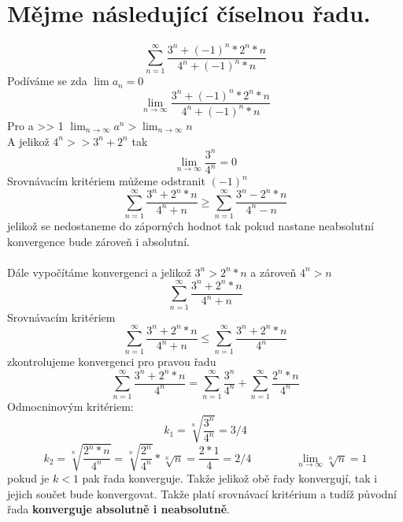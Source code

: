 \documentclass[a4paper,titlepage]{article}
\begin{document}
\section{Mějme následující číselnou řadu.}
$$
\sum^{\infty}_{n=1}\frac{3^n+(-1)^n*2^n*n}{4^n + (-1)^n*n}
$$
Podíváme se zda $\lim a_n = 0$
$$
\lim_{n\to \infty}\frac{3^n+(-1)^n*2^n*n}{4^n + (-1)^n*n}
$$
Pro a >> 1 $ \lim_{n\to \infty} a^n > \lim_{n\to \infty} n $\\
A jelikož $4^n >> 3^n + 2^n$ tak
$$
\lim_{n\to \infty}\frac{3^n}{4^n} = 0
$$
Srovnávacím kritériem můžeme odstranit $(-1)^n$ 
$$
\sum^{\infty}_{n=1}\frac{3^n+2^n*n}{4^n + n}  \geq 
\sum^{\infty}_{n=1}\frac{3^n-2^n*n}{4^n - n}
$$
jelikož se nedostaneme do záporných hodnot tak pokud nastane neabsolutní konvergence bude zároveň i absolutní.\\
\\
Dále vypočítáme konvergenci a jelikož $3^n > 2^n*n$ a zároveň $4^n > n$
$$
\sum^{\infty}_{n=1}\frac{3^n+2^n*n}{4^n + n}
$$
Srovnávacím kritériem
$$
\sum^{\infty}_{n=1}\frac{3^n+2^n*n}{4^n + n} \leq
\sum^{\infty}_{n=1}\frac{3^n + 2^n*n}{4^n}
$$
zkontrolujeme konvergenci pro pravou řadu\\
$$
\sum^{\infty}_{n=1}\frac{3^n + 2^n*n}{4^n}=
\sum^{\infty}_{n=1}\frac{3^n}{4^n}+
\sum^{\infty}_{n=1}\frac{2^n*n}{4^n}
$$
Odmocninovým kritériem:
$$
k_1 = \sqrt[n]{\frac{3^n}{4^n}} = 3/4 
$$ $$
k_2 = \sqrt[n]{\frac{2^n*n}{4^n}} = \sqrt[n]{\frac{2^n}{4^n}} * \sqrt[n]{n} = \frac{2*1}{4} = 2/4 \qquad\qquad \lim_{n \to \infty}\sqrt[n]{n} = 1
$$
pokud je $k<1$ pak řada konverguje.
Takže jelikož obě řady konvergují, tak i jejich součet bude konvergovat.
Takže platí srovnávací kritérium a tudíž původní řada \textbf{konverguje absolutně i neabsolutně}.
\end{document}
